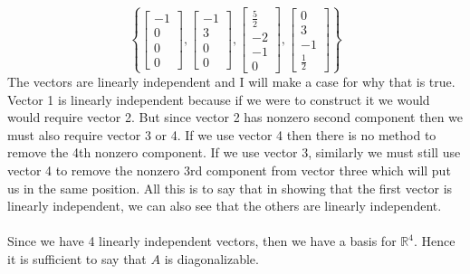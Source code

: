 \documentclass{report}
\begin{document}
$$
\left\{
\begin{bmatrix}-1\\0\\0\\0\end{bmatrix},
\begin{bmatrix}-1\\3\\0\\0\end{bmatrix},
\begin{bmatrix}\frac{5}{2}\\-2\\-1\\0\end{bmatrix}, 
\begin{bmatrix}0\\3\\-1\\\frac{1}{2}\end{bmatrix}
\right\}
$$
The vectors are linearly independent and I will make a case for why that is true.  Vector 1 is linearly independent because if we were to construct it we would would require vector 2.  But since vector 2 has nonzero second component then we must also require vector 3 or 4.  If we use vector 4 then there is no method to remove the 4th nonzero component.  If we use vector 3,  similarly we must still use vector 4 to remove the nonzero 3rd component from vector three which will put us in the same position.  All this is to say that in showing that the first vector is linearly independent,  we can also see that the others are linearly independent.  \\
\\
Since we have 4 linearly independent vectors,  then we have a basis for $\mathbb{R}^4$.  Hence it is sufficient to say that $A$ is diagonalizable. 
\sol \\
\end{document}
